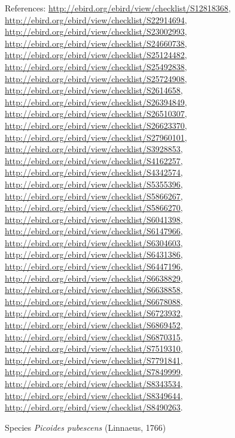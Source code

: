 \documentclass[9pt, article]{memoir}
\begin{document}
\begin{multicols}{2}
\vspace{6pt}References: 
\url{http://ebird.org/ebird/view/checklist/S12818368}, 
\url{http://ebird.org/ebird/view/checklist/S22914694}, 
\url{http://ebird.org/ebird/view/checklist/S23002993}, 
\url{http://ebird.org/ebird/view/checklist/S24660738}, 
\url{http://ebird.org/ebird/view/checklist/S25124482}, 
\url{http://ebird.org/ebird/view/checklist/S25492838}, 
\url{http://ebird.org/ebird/view/checklist/S25724908}, 
\url{http://ebird.org/ebird/view/checklist/S2614658}, 
\url{http://ebird.org/ebird/view/checklist/S26394849}, 
\url{http://ebird.org/ebird/view/checklist/S26510307}, 
\url{http://ebird.org/ebird/view/checklist/S26623370}, 
\url{http://ebird.org/ebird/view/checklist/S27960101}, 
\url{http://ebird.org/ebird/view/checklist/S3928853}, 
\url{http://ebird.org/ebird/view/checklist/S4162257}, 
\url{http://ebird.org/ebird/view/checklist/S4342574}, 
\url{http://ebird.org/ebird/view/checklist/S5355396}, 
\url{http://ebird.org/ebird/view/checklist/S5866267}, 
\url{http://ebird.org/ebird/view/checklist/S5866270}, 
\url{http://ebird.org/ebird/view/checklist/S6041398}, 
\url{http://ebird.org/ebird/view/checklist/S6147966}, 
\url{http://ebird.org/ebird/view/checklist/S6304603}, 
\url{http://ebird.org/ebird/view/checklist/S6431386}, 
\url{http://ebird.org/ebird/view/checklist/S6447196}, 
\url{http://ebird.org/ebird/view/checklist/S6638829}, 
\url{http://ebird.org/ebird/view/checklist/S6638858}, 
\url{http://ebird.org/ebird/view/checklist/S6678088}, 
\url{http://ebird.org/ebird/view/checklist/S6723932}, 
\url{http://ebird.org/ebird/view/checklist/S6869452}, 
\url{http://ebird.org/ebird/view/checklist/S6870315}, 
\url{http://ebird.org/ebird/view/checklist/S7519310}, 
\url{http://ebird.org/ebird/view/checklist/S7791841}, 
\url{http://ebird.org/ebird/view/checklist/S7849999}, 
\url{http://ebird.org/ebird/view/checklist/S8343534}, 
\url{http://ebird.org/ebird/view/checklist/S8349644}, 
\url{http://ebird.org/ebird/view/checklist/S8490263}.

\vspace{6pt}\noindent\hspace{36pt}Species \textit{Picoides pubescens} (Linnaeus, 1766)



\end{multicols}
\end{document}
